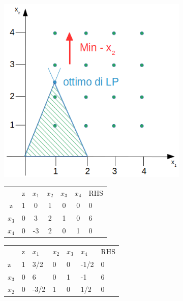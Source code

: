 \centerline{\includegraphics[height=9cm]{images/graph12.png}}

\begin{table}[h]
	\centering
	\begin{tabular}{ccccccc}
				&                       z & $x_{1}$ & $x_{2}$  & $x_{3}$ & $x_{4}$ &  RHS  \\ \cline{2-7}
			z	& \multicolumn{1}{|l|}{1} & 0       & 1        & 0       & 0       & \multicolumn{1}{|l|}{0} \\ \cline{2-7}
		$x_{3}$ & \multicolumn{1}{|l|}{0} & 3       & 2        & 1       & 0	   & \multicolumn{1}{|l|}{6} \\
		$x_{4}$ & \multicolumn{1}{|l|}{0} & -3      & {\LARGE \textcircled{\normalsize $2$}}        & 0       & 1       & \multicolumn{1}{|l|}{0} \\ \cline{2-7}
	\end{tabular}
\end{table}

\begin{table}[!h]
	\centering
	\begin{tabular}{lllllll}
		        &                       z & $x_{1}$ & $x_{2}$  & $x_{3}$ & $x_{4}$ &  RHS  \\ \cline{2-7}
		      z & \multicolumn{1}{|l|}{1} & 3/2     & 0        & 0       & -1/2    & \multicolumn{1}{|l|}{0} \\ \cline{2-7}
		$x_{3}$ & \multicolumn{1}{|l|}{0} & {\LARGE \textcircled{\normalsize $6$}}   & 0       & 1 & -1  & \multicolumn{1}{|l|}{6} \\
		$x_{2}$ & \multicolumn{1}{|l|}{0} & -3/2    & 1        & 0       & 1/2     & \multicolumn{1}{|l|}{0} \\ \cline{2-7}
	\end{tabular}
\end{table}

